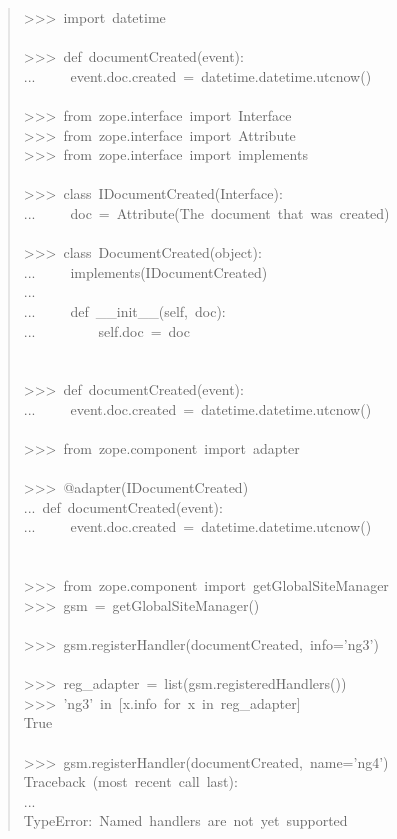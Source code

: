 \documentclass[a4paper,openany,twoside,final]{book}
\begin{document}
\begin{quote}{\ttfamily \raggedright \noindent
>{}>{}>~import~datetime\\
~\\
>{}>{}>~def~documentCreated(event):\\
...~~~~~event.doc.created~=~datetime.datetime.utcnow()\\
~\\
>{}>{}>~from~zope.interface~import~Interface\\
>{}>{}>~from~zope.interface~import~Attribute\\
>{}>{}>~from~zope.interface~import~implements\\
~\\
>{}>{}>~class~IDocumentCreated(Interface):\\
...~~~~~doc~=~Attribute(\textquotedbl{}The~document~that~was~created\textquotedbl{})\\
~\\
>{}>{}>~class~DocumentCreated(object):\\
...~~~~~implements(IDocumentCreated)\\
...\\
...~~~~~def~\_\_init\_\_(self,~doc):\\
...~~~~~~~~~self.doc~=~doc\\
~\\
~\\
>{}>{}>~def~documentCreated(event):\\
...~~~~~event.doc.created~=~datetime.datetime.utcnow()\\
~\\
>{}>{}>~from~zope.component~import~adapter\\
~\\
>{}>{}>~@adapter(IDocumentCreated)\\
...~def~documentCreated(event):\\
...~~~~~event.doc.created~=~datetime.datetime.utcnow()\\
~\\
~\\
>{}>{}>~from~zope.component~import~getGlobalSiteManager\\
>{}>{}>~gsm~=~getGlobalSiteManager()\\
~\\
>{}>{}>~gsm.registerHandler(documentCreated,~info='ng3')\\
~\\
>{}>{}>~reg\_adapter~=~list(gsm.registeredHandlers())\\
>{}>{}>~'ng3'~in~{[}x.info~for~x~in~reg\_adapter{]}\\
True\\
~\\
>{}>{}>~gsm.registerHandler(documentCreated,~name='ng4')\\
Traceback~(most~recent~call~last):\\
...\\
TypeError:~Named~handlers~are~not~yet~supported
}
\end{quote}
\end{document}
